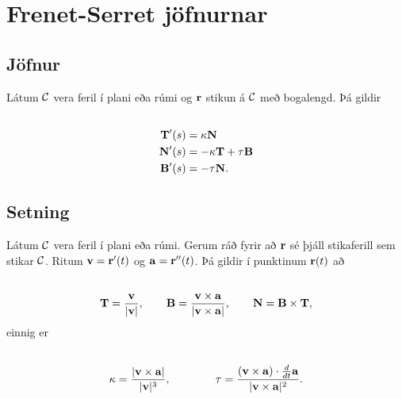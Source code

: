 \documentclass[a4paper,10pt,icelandic]{sphinxmanual}
\begin{document}
\section{Frenet-Serret jöfnurnar}
\label{Kafli1:frenet-serret-jofnurnar}

\subsection{Jöfnur}
\label{Kafli1:jofnur}\label{Kafli1:index-20}
Látum \(\cal C\) vera feril í plani eða rúmi og
\(\mbox{${\bf r}$}\) stikun á \(\cal C\) með bogalengd. Þá
gildir
\begin{gather}
\begin{split}\displaystyle\end{split}\notag\\\begin{split}\begin{aligned}
\mbox{${\bf T}$}'(s)&=\kappa\mbox{${\bf N}$}\\
\mbox{${\bf N}$}'(s)&=-\kappa\mbox{${\bf T}$}+\tau\mbox{${\bf B}$}\\
\mbox{${\bf B}$}'(s)&=-\tau\mbox{${\bf N}$}.\end{aligned}\end{split}\notag
\end{gather}

\subsection{Setning}
\label{Kafli1:id19}
Látum \(\cal C\) vera feril í plani eða rúmi. Gerum ráð fyrir að
\(\mbox{${\bf r}$}\) sé þjáll stikaferill sem stikar \(\cal C\).
Ritum \(\mbox{${\bf v}$}=\mbox{${\bf r}$}'(t)\) og
\(\mbox{${\bf a}$}=\mbox{${\bf r}$}''(t)\). Þá gildir í punktinum
\(\mbox{${\bf r}$}(t)\) að
\begin{gather}
\begin{split}\displaystyle\end{split}\notag\\\begin{split}\mbox{${\bf T}$}=\frac{\mbox{${\bf v}$}}{|\mbox{${\bf v}$}|},\qquad
\mbox{${\bf B}$}=\frac{\mbox{${\bf v}$}\times\mbox{${\bf a}$}}{|\mbox{${\bf v}$}\times\mbox{${\bf a}$}|},\qquad
\mbox{${\bf N}$}=\mbox{${\bf B}$}\times\mbox{${\bf T}$},\end{split}\notag
\end{gather}
einnig er
\begin{gather}
\begin{split}\displaystyle\end{split}\notag\\\begin{split}\kappa=\frac{|\mbox{${\bf v}$}\times\mbox{${\bf a}$}|}{|\mbox{${\bf v}$}|^3},\qquad\qquad
\tau=\frac{(\mbox{${\bf v}$}\times\mbox{${\bf a}$})\cdot \frac{d}{dt}\mbox{${\bf a}$}}{|\mbox{${\bf v}$}\times\mbox{${\bf a}$}|^2}.\end{split}\notag
\end{gather}
\end{document}
